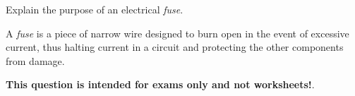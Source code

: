 

Explain the purpose of an electrical {\it fuse}.







A {\it fuse} is a piece of narrow wire designed to burn open in the event of excessive current, thus halting current in a circuit and protecting the other components from damage.







{\bf This question is intended for exams only and not worksheets!}.



